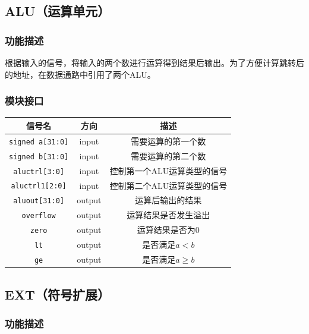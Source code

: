 \documentclass[UTF8,a4paper,autofakebold,15pt]{ctexart}
\begin{document}
\begin{center}
\end{center}

\subsection{ALU（运算单元）}

\subsubsection{功能描述}

根据输入的信号，将输入的两个数进行运算得到结果后输出。为了方便计算跳转后的地址，在数据通路中引用了两个ALU。

\subsubsection{模块接口}

\begin{center}

	\begin{tabular}{|c|c|c|}
		\hline
		信号名&方向&描述\\
		\hline
		{\tt {\color{gray}signed} a[31:0]}&input&需要运算的第一个数\\
		\hline
		{\tt {\color{gray}signed} b[31:0]}&input&需要运算的第二个数\\
		\hline
		{\tt aluctrl[3:0]}&input&控制第一个ALU运算类型的信号\\
		\hline
		{\tt aluctrl1[2:0]}&input&控制第二个ALU运算类型的信号\\
		\hline
		{\tt aluout[31:0]}&output&运算后输出的结果\\
		\hline
		{\tt overflow}&output&运算结果是否发生溢出\\
		\hline
		{\tt zero}&output&运算结果是否为0\\
		\hline
		{\tt lt}&output&是否满足$a<b$\\
		\hline
		{\tt ge}&output&是否满足$a\ge b$\\
		\hline
	\end{tabular}
	
\end{center}

\subsection{EXT（符号扩展）}

\subsubsection{功能描述}
\end{document}
